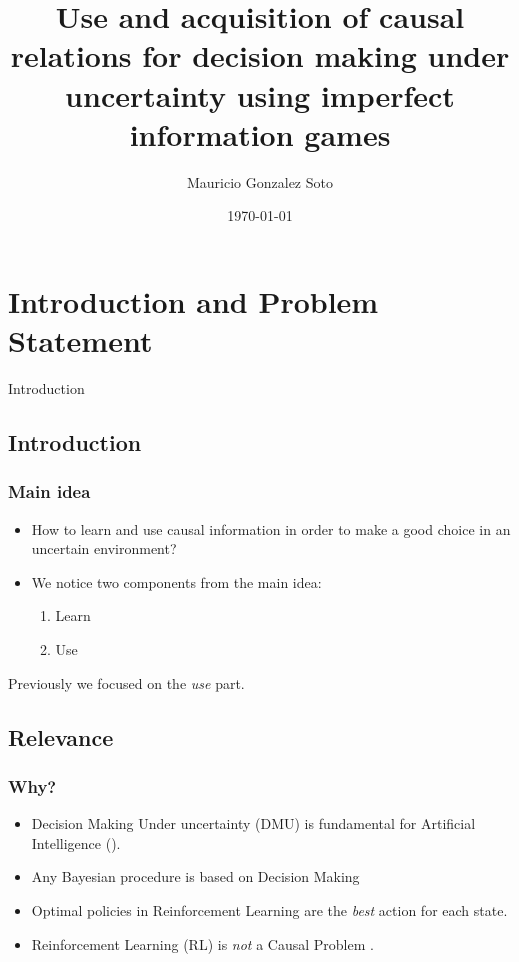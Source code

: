 \documentclass{beamer}
\title{Use and acquisition of causal relations for decision making under uncertainty using imperfect information games} %
\author{Mauricio Gonzalez Soto} %
\institute[INAOE] %
{
Instituto Nacional de Astrofísica Óptica y Electrónica \\ %
\medskip
\textit{mauricio@inaoep.mx} %
}
\date{\today} %
\theoremstyle{plain}
\begin{document}
\begin{frame}
\titlepage %
\end{frame}

\begin{frame}[allowframebreaks]
\tableofcontents
\end{frame}

\section{Introduction and Problem Statement}
\begin{frame}
\begin{center}
\LARGE{Introduction}
\end{center}
\end{frame}
\subsection{Introduction}
\begin{frame}
\frametitle{Main idea}
\begin{itemize}
\item How to learn and use causal information in order to make a good choice in an uncertain environment?
\item We notice two components from the main idea:
	\begin{enumerate}
		\item Learn
		\item Use
	\end{enumerate}
\end{itemize}
Previously we focused on the \textit{use} part.
\end{frame}

\subsection{Relevance}
\begin{frame}
\frametitle{Why?}
\begin{itemize}
\item Decision Making Under uncertainty (DMU) is fundamental for Artificial Intelligence (\cite{lake2017building}).
\item Any Bayesian procedure is based on Decision Making
\item Optimal policies in Reinforcement Learning are the \textit{best} action for each state.
\item Reinforcement Learning (RL) is \textit{not} a Causal Problem \citep{gonzalez2019reinforcement}.
\end{itemize}
\end{frame}
\end{document}
